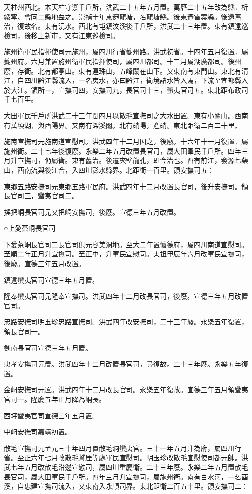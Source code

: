 天柱州西北。本天柱守禦千戶所，洪武二十五年五月置。萬曆二十五年改為縣，析綏寧、會同二縣地益之。崇禎十年東遷龍塘，名龍塘縣。後東遷雷寨縣。後還舊治，復故名。東有沅水。西北有屯鎮汶溪後千戶所，洪武二十三年置。東有鎮遠巡檢司，後移上新市，又有江東巡檢司。

施州衛軍民指揮使司元施州，屬四川行省夔州路。洪武初省。十四年五月復置，屬夔州府。六月兼置施州衛軍民指揮使司，屬四川都司。十二月屬湖廣都司。後州廢，存衛。北有都亭山。東有連珠山，五峰關在山下。又東南有東門山。東北有清江，自四川黔江縣流入，一名夷水，亦曰黔江，衛境諸水皆入焉，下流至宜都縣入於大江。領所一，宣撫司四，安撫司九，長官司十三，蠻夷官司五。東北距布政司千七百里。

大田軍民千戶所洪武二十三年閏四月以散毛宣撫司之大水田置。東有小關山。西南有萬頃湖，與酉陽界。又南有深溪關。北有硝場，產硝。東北距衛二百二十里。

施南宣撫司元施南道宣慰司。洪武四年十二月因之，後廢。十六年十一月復置，屬施州衛。二十七年後復廢。永樂二年五月改置長官司，屬大田軍民千戶所。四年三月升宣撫司，仍屬衛。東有舊治。後遷夾壁龍孔，即今治也。西有前江，發源七藥山，西南流與後江合，入四川彭水縣界。北距衛一百里。領安撫司五：

東鄉五路安撫司元東鄉五路軍民府。洪武四年十二月改置長官司，後升安撫司。領長官司三，蠻夷官司二。

搖把峒長官司元又把峒安撫司，後廢。宣德三年五月改置。

○上愛茶峒長官司

下愛茶峒長官司二長官司俱元容美洞地。至大二年置懷德府，屬四川南道宣慰司。至順二年正月升宣撫司。至正中，升軍民宣慰司。太祖甲辰年六月改軍民宣撫司，後廢。宣德三年五月改置。

鎮遠蠻夷官司宣德三年五月置。

隆奉蠻夷官司元隆奉宣撫司。洪武四年十二月改長官司，後廢。宣德三年五月改置官司。

忠路安撫司明玉珍忠路宣撫司。洪武四年改安撫司，二十三年廢。永樂五年復置，領長官司一。

劍南長官司宣德三年五月置。

忠孝安撫司元置。洪武四年十二月改置長官司，尋復故。二十三年廢。永樂五年復置。

金峒安撫司元置。洪武四年十二月改長官司。永樂五年復故。宣德三年五月領蠻夷官司一。隆慶五年正月降為峒長。

西坪蠻夷官司宣德三年五月置。

中峒安撫司嘉靖初置。

散毛宣撫司元至元三十年四月置散毛洞蠻夷官。三十一年五月升為府，屬四川行省。至正六年七月改散毛誓厓等處軍民宣慰司。明玉珍改散毛宣慰使司都元帥。洪武七年五月改散毛沿邊宣慰司，屬四川重慶衛。二十三年廢。永樂二年五月置散毛長官司，屬大田軍民千戶所。四年三月升宣撫司，屬施州衛。南有白水河，一名酉溪，自忠建宣撫司流入，又東南入永順司界。東北距衛二百五十里。領安撫司二：

